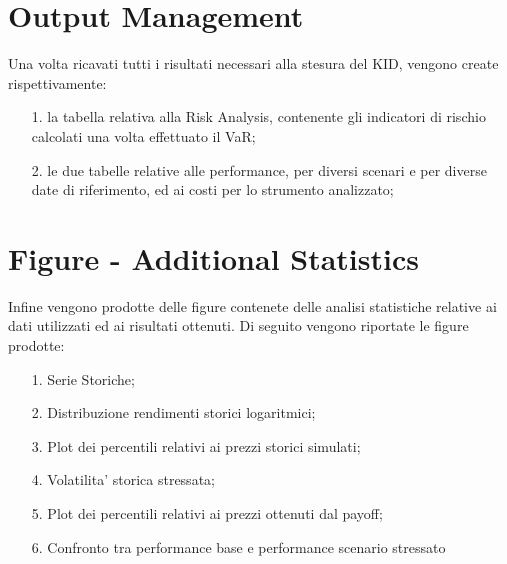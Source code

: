 \documentclass[11pt,fleqn]{extarticle}
\begin{document}
\section{Output Management}
Una volta ricavati tutti i risultati necessari alla stesura del KID, vengono create rispettivamente:
\begin{itemize}
\item[1.] la tabella relativa alla Risk Analysis, contenente gli indicatori di rischio calcolati una volta effettuato il VaR;  
\item[2.] le due tabelle relative alle performance, per diversi scenari e per diverse date di riferimento, ed ai costi per lo strumento analizzato;
\end{itemize}

\section{Figure - Additional Statistics}
Infine vengono prodotte delle figure contenete delle analisi statistiche relative ai dati utilizzati ed ai risultati ottenuti. Di seguito vengono riportate le figure prodotte:
\begin{itemize}
\item[1.] Serie Storiche;
\item[2.] Distribuzione rendimenti storici logaritmici;
\item[3.] Plot dei percentili relativi ai prezzi storici simulati;
\item[4.] Volatilita' storica stressata;
\item[5.] Plot dei percentili relativi ai prezzi ottenuti dal payoff;
\item[6.] Confronto tra performance base e performance scenario stressato
\end{itemize}






\appendix

\end{document}
